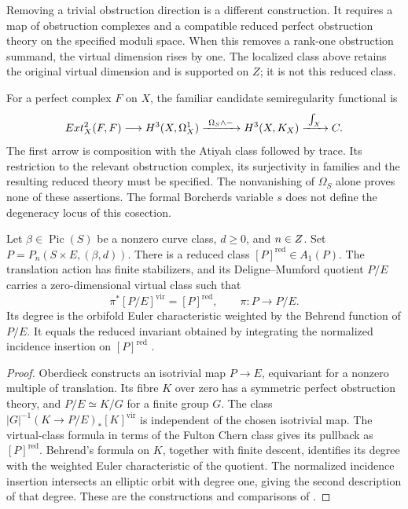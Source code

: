 Removing a trivial obstruction direction is a different construction.
It requires a map of obstruction complexes and a compatible reduced
perfect obstruction theory on the specified moduli space. When this
removes a rank-one obstruction summand, the virtual dimension rises
by one. The localized class above retains the original virtual
dimension and is supported on $Z$; it is not this reduced class.

For a perfect complex $F$ on $X$, the familiar candidate
semiregularity functional is
\[
 Ext^2_X(F,F)\longrightarrow H^3(X,\Omega_X^1)
 \xrightarrow{\ \Omega_S\wedge-\ }H^3(X,K_X)
 \xrightarrow{\ \int_X\ }C.
\]
The first arrow is composition with the Atiyah class followed by
trace. Its restriction to the relevant obstruction complex, its
surjectivity in families and the resulting reduced theory must be
specified. The nonvanishing of $\Omega_S$ alone proves none of
these assertions. The formal Borcherds variable $s$ does not define
the degeneracy locus of this cosection.

\begin{theorem}
\label{thm:reduced-virtual-class-K3xE}
Let $\beta\in\operatorname{Pic}(S)$ be a nonzero curve class,
$d\geq0$, and $n\in Z$. Set
$P=P_n(S\times E,(\beta,d))$. There is a reduced class
$[P]^{\mathrm{red}}\in A_1(P)$. The translation action has finite
stabilizers, and its Deligne--Mumford quotient $P/E$ carries a
zero-dimensional virtual class such that
\[
 \pi^*[P/E]^{\mathrm{vir}}=[P]^{\mathrm{red}},
 \qquad \pi:P\longrightarrow P/E.
\]
Its degree is the orbifold Euler characteristic weighted by the
Behrend function of $P/E$. It equals the reduced invariant obtained
by integrating the normalized incidence insertion on $[P]^{\mathrm{red}}$
\cite[Theorems~1--2]{OberdieckReducedPT}.
\end{theorem}

\begin{proof}
Oberdieck constructs an isotrivial map $P\to E$, equivariant for a
nonzero multiple of translation. Its fibre $K$ over zero has a
symmetric perfect obstruction theory, and $P/E\simeq K/G$ for a
finite group $G$. The class
$|G|^{-1}(K\to P/E)_*[K]^{\mathrm{vir}}$ is independent of the
chosen isotrivial map. The virtual-class formula in terms of the
Fulton Chern class gives its pullback as $[P]^{\mathrm{red}}$.
Behrend's formula on $K$, together with finite descent, identifies
its degree with the weighted Euler characteristic of the quotient.
The normalized incidence insertion intersects an elliptic orbit
with degree one, giving the second description of that degree.
These are the constructions and comparisons of
\cite[\S3]{OberdieckReducedPT}.
\end{proof}

